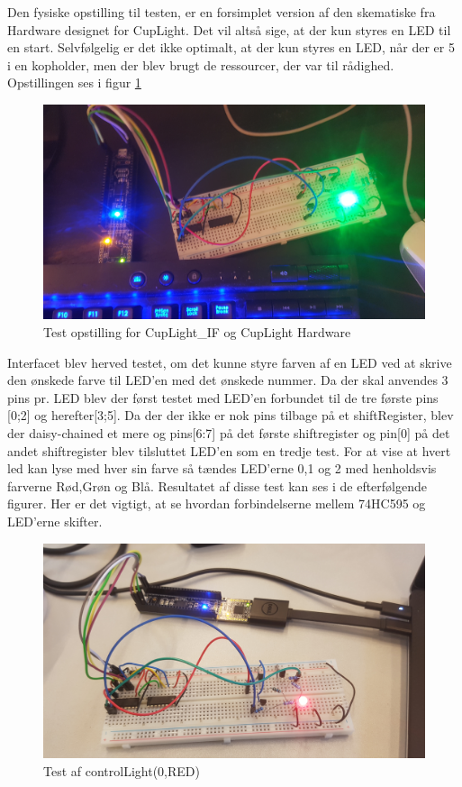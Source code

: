 \documentclass[Modultest/Modultest_main.tex]{subfiles}
\begin{document}
Den fysiske opstilling til testen, er en forsimplet version af den skematiske fra Hardware designet for CupLight. Det vil altså sige, at der kun styres en LED til en start. Selvfølgelig er det ikke optimalt, at der kun styres en LED, når der er 5 i en kopholder, men der blev brugt de ressourcer, der var til rådighed. Opstillingen ses i figur \ref{fig:cupLight_test}

\begin{figure}[H]
    \centering
    \includegraphics[width=\textwidth]{Modultest/CupLight/graphics/CupLight_IF_TEST.jpg}
    \caption{Test opstilling for CupLight\_IF og CupLight Hardware}
    \label{fig:cupLight_test}
\end{figure}

Interfacet blev herved testet, om det kunne styre farven af en LED ved at skrive den ønskede farve til LED'en med det ønskede nummer. Da der skal anvendes 3 pins pr. LED blev der først testet med LED'en forbundet til de tre første pins [0;2] og herefter[3;5]. Da der der ikke er nok pins tilbage på et shiftRegister, blev der daisy-chained et mere og pins[6:7] på det første shiftregister og pin[0] på det andet shiftregister blev tilsluttet LED'en som en tredje test. For at vise at hvert led kan lyse med hver sin farve så tændes LED'erne 0,1 og 2 med henholdsvis farverne Rød,Grøn og Blå. Resultatet af disse test kan ses i de efterfølgende figurer. Her er det vigtigt, at se hvordan forbindelserne mellem 74HC595 og LED'erne skifter.

\begin{figure}[H]
    \centering
    \includegraphics[width=\textwidth]{Modultest/CupLight/graphics/interface_test1.jpg}
    \caption{Test af controlLight(0,RED)}
    \label{fig:cuplight_red_test1}
\end{figure}
\end{document}
